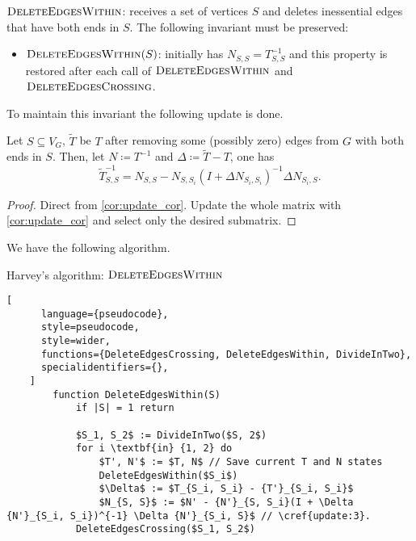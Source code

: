 \(\textsc{DeleteEdgesWithin}\): receives a set of vertices \(S\) and deletes inessential edges that have both ends in \(S\).
The following invariant must be preserved:
\begin{itemize}
    \item \(\textsc{DeleteEdgesWithin}(S)\): initially has \(N_{S, S} = T^{-1}_{S, S}\) and this property is restored after each call of \(\textsc{DeleteEdgesWithin}\)
    and \(\textsc{DeleteEdgesCrossing}\).
\end{itemize}
To maintain this invariant the following update is done.
\begin{theorem}[Update 3]
\label{update:3}
    Let \(S \subseteq V_G\), \(\tilde{T}\) be \(T\) after removing some (possibly zero) edges from \(G\) with both ends in \(S\).
    Then, let \(N \coloneqq T^{-1}\) and \(\Delta \coloneqq \tilde{T} - T\), one has
    \[
        {\tilde{T}}^{-1}_{S, S} = N_{S, S} - N_{S, S_i}(I + \Delta N_{S_i, S_i})^{-1} \Delta N_{S_i, S}.
    \]
\end{theorem}

\begin{proof}
    Direct from \cref{cor:update_cor}. Update the whole matrix with \ref{cor:update_cor} and select only the desired submatrix.
\end{proof}

We have the following algorithm.

\begin{programruledcaption}{Harvey's algorithm: \(\textsc{DeleteEdgesWithin}\)}
    \begin{lstlisting}[
      language={pseudocode},
      style=pseudocode,
      style=wider,
      functions={DeleteEdgesCrossing, DeleteEdgesWithin, DivideInTwo},
      specialidentifiers={},
    ]
        function DeleteEdgesWithin(S)
            if |S| = 1 return

            $S_1, S_2$ := DivideInTwo($S, 2$)
            for i \textbf{in} {1, 2} do
                $T', N'$ := $T, N$ // Save current T and N states
                DeleteEdgesWithin($S_i$)
                $\Delta$ := $T_{S_i, S_i} - {T'}_{S_i, S_i}$
                $N_{S, S}$ := $N' - {N'}_{S, S_i}(I + \Delta {N'}_{S_i, S_i})^{-1} \Delta {N'}_{S_i, S}$ // \cref{update:3}. 
            DeleteEdgesCrossing($S_1, S_2$)
    \end{lstlisting}
\end{programruledcaption}


